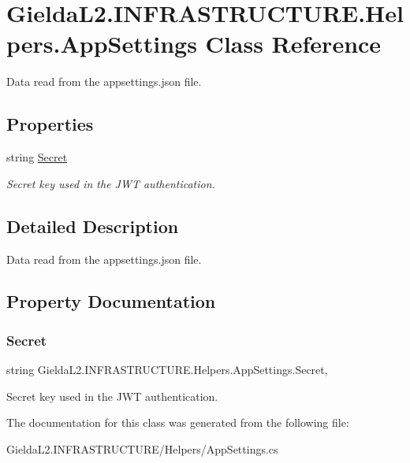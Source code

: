 \hypertarget{class_gielda_l2_1_1_i_n_f_r_a_s_t_r_u_c_t_u_r_e_1_1_helpers_1_1_app_settings}{}\section{Gielda\+L2.\+I\+N\+F\+R\+A\+S\+T\+R\+U\+C\+T\+U\+R\+E.\+Helpers.\+App\+Settings Class Reference}
\label{class_gielda_l2_1_1_i_n_f_r_a_s_t_r_u_c_t_u_r_e_1_1_helpers_1_1_app_settings}


Data read from the appsettings.\+json file.  


\subsection*{Properties}
\begin{DoxyCompactItemize}
\item 
string \mbox{\hyperlink{class_gielda_l2_1_1_i_n_f_r_a_s_t_r_u_c_t_u_r_e_1_1_helpers_1_1_app_settings_aebbae35a4ed65caa414e02a21ea5d3b0}{Secret}}
\begin{DoxyCompactList}\small\item\em Secret key used in the J\+WT authentication. \end{DoxyCompactList}\end{DoxyCompactItemize}


\subsection{Detailed Description}
Data read from the appsettings.\+json file. 



\subsection{Property Documentation}
\mbox{\label{class_gielda_l2_1_1_i_n_f_r_a_s_t_r_u_c_t_u_r_e_1_1_helpers_1_1_app_settings_aebbae35a4ed65caa414e02a21ea5d3b0}} 
\subsubsection{\texorpdfstring{Secret}{Secret}}
{\footnotesize\ttfamily string Gielda\+L2.\+I\+N\+F\+R\+A\+S\+T\+R\+U\+C\+T\+U\+R\+E.\+Helpers.\+App\+Settings.\+Secret\hspace{0.3cm}{\ttfamily [get]}, {\ttfamily [set]}}



Secret key used in the J\+WT authentication. 



The documentation for this class was generated from the following file\+:\begin{DoxyCompactItemize}
\item 
Gielda\+L2.\+I\+N\+F\+R\+A\+S\+T\+R\+U\+C\+T\+U\+R\+E/\+Helpers/App\+Settings.\+cs\end{DoxyCompactItemize}
